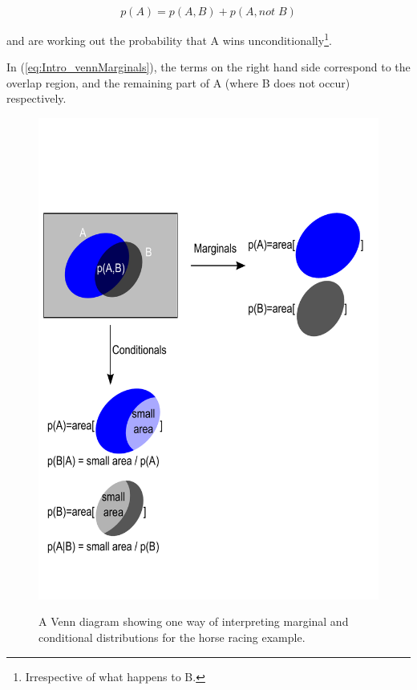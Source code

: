 \documentclass[11pt,fullpage]{book}
\begin{document}
\begin{equation}\label{eq:Intro_vennMarginals}
p(A) = p(A,B) + p(A,not\; B)
\end{equation}

and are working out the probability that A wins unconditionally\footnote{Irrespective of what happens to B.}.

In (\ref{eq:Intro_vennMarginals}), the terms on the right hand side correspond to the overlap region, and the remaining part of A (where B does not occur) respectively.

\begin{figure}
\centering
\scalebox{0.5} 
{\includegraphics{Intro_Venn.pdf}}
\caption{A Venn diagram showing one way of interpreting marginal and conditional distributions for the horse racing example.}\label{fig:Intro_Venn}
\end{figure}
\end{document}

